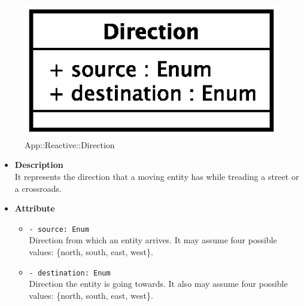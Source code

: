 \begin{figure}[h]
\centering
\includegraphics[scale=0.6,keepaspectratio]{images/solution/direction.eps}
\caption{App::Reactive::Direction}
\label{fig:sd-app-direction}
\end{figure}
\FloatBarrier
\begin{itemize}
  \item \textbf{Description} \\
    It represents the direction that a moving entity has while treading a
    street or a crossroads.
  \item \textbf{Attribute}
  \begin{itemize}
    \item \texttt{- source: Enum} \\
Direction from which an entity arrives. It may assume four possible
values: \{north, south, east, west\}.
    \item \texttt{- destination: Enum} \\
Direction the entity is going towards.  It also may assume four possible
values: \{north, south, east, west\}.
  \end{itemize}
\end{itemize}
